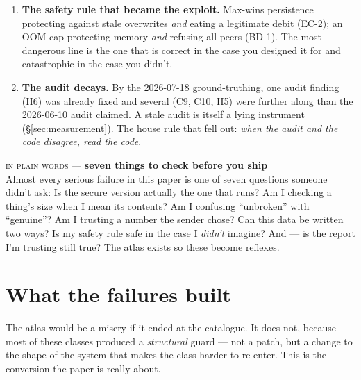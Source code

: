 \documentclass[10pt,a4paper]{article}
\newcommand{\layman}[3]{%
\begin{tcolorbox}[enhanced,
  interior style={left color=#1!9,right color=white},
  colframe=#1!45!slate,boxrule=0.5pt,arc=3pt,
  borderline west={2.5pt}{0pt}{#1},
  left=9pt,right=9pt,top=7pt,bottom=7pt]
{\scriptsize\textcolor{#1}{\textsc{in plain words}}\; — \;\textbf{\small #2}}\\[3pt]
\small #3
\end{tcolorbox}}
\begin{document}
\begin{enumerate}[leftmargin=1.5em,itemsep=5pt]
\item \textbf{The safety rule that became the exploit.} Max-wins persistence protecting
against stale overwrites \emph{and} eating a legitimate debit (EC-2); an OOM cap
protecting memory \emph{and} refusing all peers (BD-1). The most dangerous line is the one
that is correct in the case you designed it for and catastrophic in the case you didn't.

\item \textbf{The audit decays.} By the 2026-07-18 ground-truthing, one audit finding
(H6) was already fixed and several (C9, C10, H5) were further along than the 2026-06-10
audit claimed. A stale audit is itself a lying instrument (\S\ref{sec:measurement}). The
house rule that fell out: \emph{when the audit and the code disagree, read the code}.
\end{enumerate}

\layman{sigilviolet}{seven things to check before you ship}{Almost every serious failure
in this paper is one of seven questions someone didn't ask: Is the secure version actually
the one that runs? Am I checking a thing's size when I mean its contents? Am I confusing
``unbroken'' with ``genuine''? Am I trusting a number the sender chose? Can this data be
written two ways? Is my safety rule safe in the case I \emph{didn't} imagine? And — is the
report I'm trusting still true? The atlas exists so these become reflexes.}

\section{What the failures built}\label{sec:guards}

The atlas would be a misery if it ended at the catalogue. It does not, because most of
these classes produced a \emph{structural} guard — not a patch, but a change to the shape
of the system that makes the class harder to re-enter. This is the conversion the paper
is really about.
\end{document}
